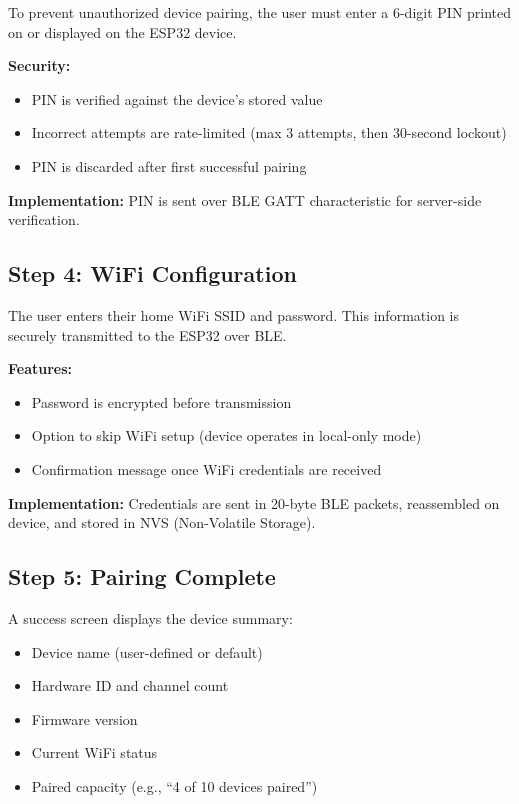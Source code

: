To prevent unauthorized device pairing, the user must enter a 6-digit PIN printed on or displayed on the ESP32 device.

\textbf{Security:}
\begin{itemize}
    \item PIN is verified against the device's stored value
    \item Incorrect attempts are rate-limited (max 3 attempts, then 30-second lockout)
    \item PIN is discarded after first successful pairing
\end{itemize}

\textbf{Implementation:} PIN is sent over BLE GATT characteristic for server-side verification.

\subsection{Step 4: WiFi Configuration}

The user enters their home WiFi SSID and password. This information is securely transmitted to the ESP32 over BLE.

\textbf{Features:}
\begin{itemize}
    \item Password is encrypted before transmission
    \item Option to skip WiFi setup (device operates in local-only mode)
    \item Confirmation message once WiFi credentials are received
\end{itemize}

\textbf{Implementation:} Credentials are sent in 20-byte BLE packets, reassembled on device, and stored in NVS (Non-Volatile Storage).

\subsection{Step 5: Pairing Complete}

A success screen displays the device summary:

\begin{itemize}
    \item Device name (user-defined or default)
    \item Hardware ID and channel count
    \item Firmware version
    \item Current WiFi status
    \item Paired capacity (e.g., ``4 of 10 devices paired'')
\end{itemize}


